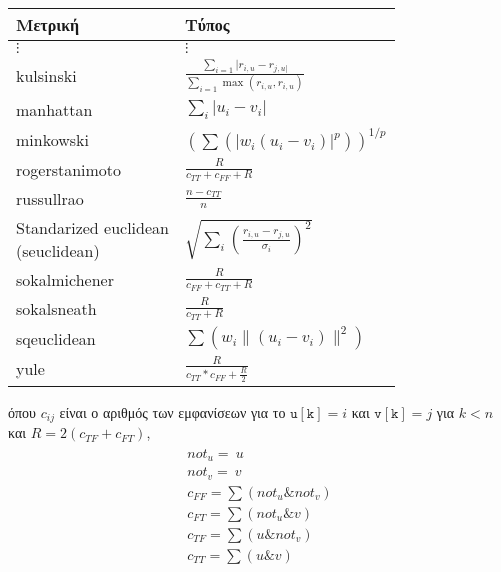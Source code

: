 \begin{table}[H]
\begin{minipage}{0.5\textwidth}
\end{minipage} \hfill
\begin{minipage}{0.5\textwidth}
   \begin{tabular}{| l | l |} \hline {\textbf{Μετρική}} & {\textbf{Τύπος}} \\  \hline  
  $ \vdots $ &$  \vdots $  \\[2.65mm]  
 kulsinski & \(\displaystyle \frac{\sum_{i=1}|r_{i,u}-r_{j,u|}}{\sum_{i=1}\max{\left( r_{i,u},r_{i,u} \right) }} \)\\[6mm] 
      manhattan & $  \sum_i {\left| u_i - v_i \right|} $\\[6mm] 
minkowski & $ \left(\sum{\left( |w_i (u_i - v_i)|^p\right) }\right)^{1/p} $\\[6mm] 
rogerstanimoto & \(\displaystyle  \frac{R}{c_{TT} + c_{FF} + R} \) \\[6mm] 
russullrao & \(\displaystyle  \frac{n - c_{TT}}{n} \) \\[6mm] 
\shortstack[l] {Standarized euclidean \\ (seuclidean)} &  \(\displaystyle  \sqrt{\sum_i {\left( \frac{ r_{i,u} - r_{j,u}}{\sigma_i} \right)^2}} \) \\[6mm] 
sokalmichener & \(\displaystyle  \frac{R}{c_{FF} + c_{TT} + R} \) \\[6mm]  
sokalsneath & \(\displaystyle \frac{R}{c_{TT} + R}  \) \\[6mm]  
sqeuclidean & \(\displaystyle \sum{\left( w_i \|\left( u_i - v_i \right) \|^2\right) } \) \\[6mm] 
yule & \(\displaystyle \frac{R}{c_{TT} * c_{FF} + \frac{R}{2}} \) \\[6mm] 
	\hline 
\end{tabular}
\end{minipage}
\end{table}
όπου $ c_{ij} $ είναι ο αριθμός των εμφανίσεων για το 
$ \mathtt{u[k]} = i $ και $ \mathtt{v[k]} = j $ για
$ k < n $ και $ R = 2(c_{TF} + c_{FT}) $, 
\begin{align} 
	\begin{split}
 not_u = ~u \\
not_v = ~v \\
c_{FF} = \sum(not_u \& not_v) \\
c_{FT} = \sum(not_u \& v) \\
c_{TF} = \sum(u \& not_v) \\
c_{TT} = \sum(u \& v)
\end{split}
\end{align}
